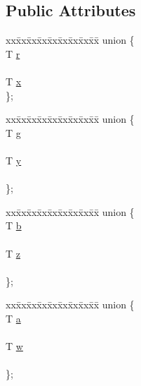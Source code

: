 \subsection*{Public Attributes}
\begin{DoxyCompactItemize}
\item 
\begin{tabbing}
xx\=xx\=xx\=xx\=xx\=xx\=xx\=xx\=xx\=\kill
union \{\\
\>T \hyperlink{class_vector4_add0f79fe4a8f6d4e1d2aadb2f0c9bbdd}{r}\\
\>\\
\>T \hyperlink{class_vector4_a2cedf20d2f695a4f0254681b13311ac9}{x}\\
\}; \\

\end{tabbing}\item 
\begin{tabbing}
xx\=xx\=xx\=xx\=xx\=xx\=xx\=xx\=xx\=\kill
union \{\\
\>T \hyperlink{class_vector4_acd9cbf0e72286a325f50793cab3d94e0}{g}\\
\>\\
\>T \hyperlink{class_vector4_aad001ba27515dc2dcb921e9c83596520}{y}\\
\>\\
\}; \\

\end{tabbing}\item 
\begin{tabbing}
xx\=xx\=xx\=xx\=xx\=xx\=xx\=xx\=xx\=\kill
union \{\\
\>T \hyperlink{class_vector4_a147df940f8e570124eb54226be07f28b}{b}\\
\>\\
\>T \hyperlink{class_vector4_a5a7a1452d661e0b24e4b04c4dbff8ae7}{z}\\
\>\\
\}; \\

\end{tabbing}\item 
\begin{tabbing}
xx\=xx\=xx\=xx\=xx\=xx\=xx\=xx\=xx\=\kill
union \{\\
\>T \hyperlink{class_vector4_a32a0b541c80b0eb5c2c08634b7ab4e3b}{a}\\
\>\\
\>T \hyperlink{class_vector4_a83daff43fa2b88b4e76474f4b9a45276}{w}\\
\>\\
\}; \\

\end{tabbing}\end{DoxyCompactItemize}

